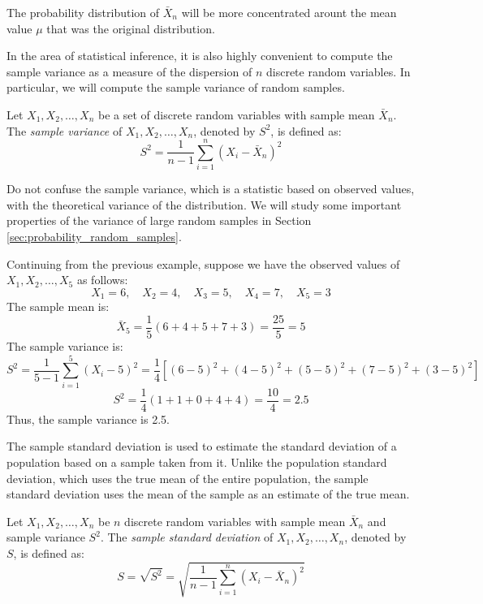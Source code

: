 The probability distribution of $\bar{X}_n$ will be more concentrated arount the mean value $\mu$ that was the original distribution. 

In the area of statistical inference, it is also highly convenient to compute the sample variance as a measure of the dispersion of \( n \) discrete random variables. In particular, we will compute the sample variance of random samples.

\begin{definition}
Let \( X_1, X_2, \ldots, X_n \) be a set of discrete random variables with sample mean \( \bar{X}_n \). The \emph{sample variance} of \( X_1, X_2, \ldots, X_n \), denoted by \( S^2 \), is defined as:
\[
S^2 = \frac{1}{n - 1} \sum_{i=1}^n \left( X_i - \bar{X}_n \right)^2
\]
\end{definition}

Do not confuse the sample variance, which is a statistic based on observed values, with the theoretical variance of the distribution. We will study some important properties of the variance of large random samples in Section \ref{sec:probability_random_samples}.

\begin{example}
Continuing from the previous example, suppose we have the observed values of \( X_1, X_2, \ldots, X_5 \) as follows:
\[
X_1 = 6, \quad X_2 = 4, \quad X_3 = 5, \quad X_4 = 7, \quad X_5 = 3
\]
The sample mean is:
\[
\bar{X}_5 = \frac{1}{5} \left( 6 + 4 + 5 + 7 + 3 \right) = \frac{25}{5} = 5
\]
The sample variance is:
\[
S^2 = \frac{1}{5 - 1} \sum_{i=1}^{5} \left( X_i - 5 \right)^2 = \frac{1}{4} \left[ (6 - 5)^2 + (4 - 5)^2 + (5 - 5)^2 + (7 - 5)^2 + (3 - 5)^2 \right]
\]
\[
S^2 = \frac{1}{4} \left( 1 + 1 + 0 + 4 + 4 \right) = \frac{10}{4} = 2.5
\]
Thus, the sample variance is 2.5.
\end{example}

The sample standard deviation is used to estimate the standard deviation of a population based on a sample taken from it. Unlike the population standard deviation, which uses the true mean of the entire population, the sample standard deviation uses the mean of the sample as an estimate of the true mean.

\begin{definition}
Let \( X_1, X_2, \ldots, X_n \) be \( n \) discrete random variables with sample mean \( \bar{X}_n \) and sample variance \( S^2 \). The \emph{sample standard deviation} of \( X_1, X_2, \ldots, X_n \), denoted by \( S \), is defined as:
\[
S = \sqrt{S^2} = \sqrt{ \frac{1}{n - 1} \sum_{i=1}^{n} \left( X_i - \bar{X}_n \right)^2 }
\]
\end{definition}

